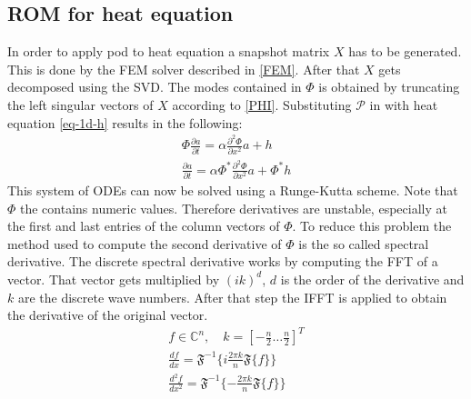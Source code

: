 \subsection{ROM for heat equation}
In order to apply pod to heat equation a snapshot matrix \(X\) has to be generated.
This is done by the FEM solver described in \ref{FEM}.
After that \(X\) gets decomposed using the SVD.
The modes contained in \(\Phi\) is obtained by truncating the left singular vectors of \(X\) according to \ref{PHI}.
Substituting \(\mathscr{P}\) in \label{label-u-aprox} with heat equation \ref{eq-1d-h} results in the following:
\begin{gather}
\Phi \frac{\partial a}{\partial t}  = \alpha \frac{\partial^{2} \Phi}{\partial x^{2}} a + h\\
\frac{\partial a}{\partial t} = \alpha \Phi^{*}  \frac{\partial^{2} \Phi}{\partial x^{2}} a + \Phi^{*}h
\end{gather}
\newpage
This system of ODEs can now be solved using a Runge-Kutta scheme.
Note that \(\Phi\) the contains numeric values.
Therefore derivatives are unstable, especially at the first and last entries of the column vectors of \(\Phi\).
To reduce this problem the method used to compute the second derivative of \(\Phi\) is the so called spectral derivative.
The discrete spectral derivative works by computing the FFT of a vector.
That vector gets multiplied by \((ik)^{d}\), \(d\) is the order of the derivative and \(k\) are the discrete wave numbers.
After that step the IFFT is applied to obtain the derivative of the original vector.
\begin{gather}
f \in \mathbb{C}^{n}, \quad k = [-\frac{n}{2} \hdots \frac{n}{2}]^{T} \\
\frac{df}{dx} = \mathfrak{F}^{-1}\{i \frac{2 \pi k}{n} \mathfrak{F}\{f\}\} \\
\frac{d^{2}f}{dx^{2}} = \mathfrak{F}^{-1}\{-\frac{2 \pi k}{n} \mathfrak{F}\{f\}\} \\
\end{gather}
\cite{brunton_kutz_2019f}


